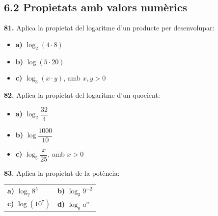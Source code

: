 \documentclass[13pt,a4paper]{extarticle}
\begin{document}
\subsection*{6.2 Propietats amb valors numèrics}

\par\noindent\begin{minipage}{\linewidth}
\textbf{81.} Aplica la propietat del logaritme d'un producte per desenvolupar:\par

\begin{itemize}[leftmargin=0pt,itemsep=3pt,topsep=3pt,parsep=0pt,label={}]
\item \textbf{a)} $\log_2\left(4\cdot 8\right)$
\item \textbf{b)} $\log\left(5\cdot 20\right)$
\item \textbf{c)} $\log_3\left(x\cdot y\right)$, amb $x,y>0$
\end{itemize}
\end{minipage}\par\vspace{1.6mm}
\par\noindent\begin{minipage}{\linewidth}
\textbf{82.} Aplica la propietat del logaritme d'un quocient:\par

\begin{itemize}[leftmargin=0pt,itemsep=3pt,topsep=3pt,parsep=0pt,label={}]
\item \textbf{a)} $\log_2 \dfrac{32}{4}$
\item \textbf{b)} $\log \dfrac{1000}{10}$
\item \textbf{c)} $\log_5 \dfrac{x}{25}$, amb $x>0$
\end{itemize}
\end{minipage}\par\vspace{1.6mm}
\par\noindent\begin{minipage}{\linewidth}
\textbf{83.} Aplica la propietat de la potència:\par

\begin{tabular}{@{}p{.46\linewidth}p{.46\linewidth}@{}}
\textbf{a)} $\log_2 8^5$ & \textbf{b)} $\log_3 9^{-2}$ \\[2pt]
\textbf{c)} $\log\left(10^7\right)$ & \textbf{d)} $\log_a a^n$ \\[2pt]
\end{tabular}\par
\end{minipage}\par\vspace{1.6mm}
\end{document}
